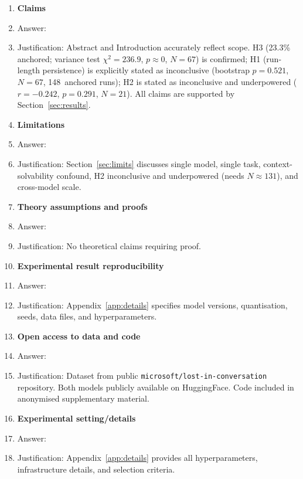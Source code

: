 \documentclass{article}
\begin{document}
\begin{enumerate}

\item \textbf{Claims}
  \item[] Answer: \answerYes{}
  \item[] Justification: Abstract and Introduction accurately
  reflect scope. H3 (23.3\% anchored; variance test $\chi^2=236.9$,
  $p\approx0$, $N=67$) is confirmed; H1 (run-length persistence) is
  explicitly stated as inconclusive (bootstrap $p=0.521$, $N=67$,
  148~anchored runs); H2 is stated as inconclusive and underpowered
  ($r=-0.242$, $p=0.291$, $N=21$).
  All claims are supported by Section~\ref{sec:results}.

\item \textbf{Limitations}
  \item[] Answer: \answerYes{}
  \item[] Justification: Section~\ref{sec:limits} discusses single
  model, single task, context-solvability confound, H2 inconclusive
  and underpowered (needs $N\approx131$), and cross-model scale.

\item \textbf{Theory assumptions and proofs}
  \item[] Answer: \answerNA{}
  \item[] Justification: No theoretical claims requiring proof.

\item \textbf{Experimental result reproducibility}
  \item[] Answer: \answerYes{}
  \item[] Justification: Appendix~\ref{app:details} specifies model
  versions, quantisation, seeds, data files, and hyperparameters.

\item \textbf{Open access to data and code}
  \item[] Answer: \answerYes{}
  \item[] Justification: Dataset from public
  \texttt{microsoft/lost-in-conversation} repository.
  Both models publicly available on HuggingFace.
  Code included in anonymised supplementary material.

\item \textbf{Experimental setting/details}
  \item[] Answer: \answerYes{}
  \item[] Justification: Appendix~\ref{app:details} provides all
  hyperparameters, infrastructure details, and selection criteria.


\end{enumerate}
\end{document}
